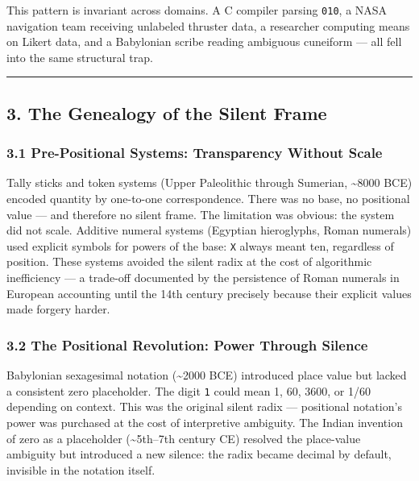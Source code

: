\documentclass[
]{article}
\begin{document}
This pattern is invariant across domains. A C compiler parsing
\texttt{010}, a NASA navigation team receiving unlabeled thruster data,
a researcher computing means on Likert data, and a Babylonian scribe
reading ambiguous cuneiform --- all fell into the same structural trap.

\begin{center}\rule{0.5\linewidth}{0.5pt}\end{center}

\subsection{3. The Genealogy of the Silent
Frame}\label{the-genealogy-of-the-silent-frame}

\subsubsection{3.1 Pre-Positional Systems: Transparency Without
Scale}\label{pre-positional-systems-transparency-without-scale}

Tally sticks and token systems (Upper Paleolithic through Sumerian,
\textasciitilde8000 BCE) encoded quantity by one-to-one correspondence.
There was no base, no positional value --- and therefore no silent
frame. The limitation was obvious: the system did not scale. Additive
numeral systems (Egyptian hieroglyphs, Roman numerals) used explicit
symbols for powers of the base: \texttt{X} always meant ten, regardless
of position. These systems avoided the silent radix at the cost of
algorithmic inefficiency --- a trade-off documented by the persistence
of Roman numerals in European accounting until the 14th century
precisely because their explicit values made forgery harder.

\subsubsection{3.2 The Positional Revolution: Power Through
Silence}\label{the-positional-revolution-power-through-silence}

Babylonian sexagesimal notation (\textasciitilde2000 BCE) introduced
place value but lacked a consistent zero placeholder. The digit
\texttt{1} could mean 1, 60, 3600, or 1/60 depending on context. This
was the original silent radix --- positional notation's power was
purchased at the cost of interpretive ambiguity. The Indian invention of
zero as a placeholder (\textasciitilde5th--7th century CE) resolved the
place-value ambiguity but introduced a new silence: the radix became
decimal by default, invisible in the notation itself.
\end{document}

